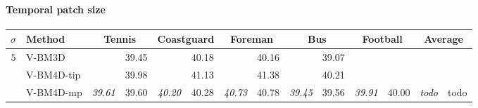 \documentclass[10pt, journal, twocolumn, final, a4paper]{IEEEtran}
\newcommand{\best}[1]{#1}
\newcommand{\bsic}[1]{\textcolor{black}{\textit{#1}}}
\begin{document}
%

%

\paragraph{Temporal patch size} 

\begin{table}[htp!]
	\begin{center}
		{%
		\renewcommand{\tabcolsep}{1.6mm}
		\renewcommand{\arraystretch}{1.3}
		\begin{tabular}{ c | l |c c | c c | c c | c c | c c | c c}
			\hline
			\rule{0pt}{10pt}$\sigma$ & Method            & \multicolumn{2}{c}{Tennis}  & \multicolumn{2}{c}{Coastguard}&\multicolumn{2}{c}{Foreman}& \multicolumn{2}{c}{Bus}     &\multicolumn{2}{c|}{Football}& \multicolumn{2}{c}{Average}\\\hline
			\multirow{1}{*}{$ 5$}
			                      & V-BM3D               & \bsic{     } &       39.45  & \bsic{     } &       40.18  & \bsic{     } &       40.16  & \bsic{     } &       39.07  & \bsic{     } &              & \bsic{     } &              \\
			                      & V-BM4D-tip           & \bsic{     } & \best{39.98} & \bsic{     } & \best{41.13} & \bsic{     } & \best{41.38} & \bsic{     } & \best{40.21} & \bsic{     } & \best{     } & \bsic{     } & \best{     } \\
			                      & V-BM4D-mp            & \bsic{39.61} &       39.60  & \bsic{40.20} &       40.28  & \bsic{40.73} &       40.78  & \bsic{39.45} &       39.56  & \bsic{39.91} &       40.00  & \bsic{todo } &       todo   \\

\end{tabular}}
\end{center}
\end{table}
\end{document}
